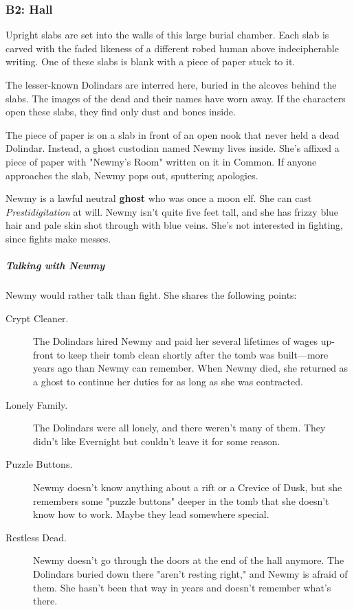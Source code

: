 \documentclass[10pt,a4paper,twoside,bg=print,twocolumn,openany,nodeprecatedcode]{dndbook}
\begin{document}
\subsubsection{B2: Hall}
\begin{DndReadAloud}{}
Upright slabs are set into the walls of this large burial chamber. Each slab is carved with the faded likeness of a different robed human above indecipherable writing. One of these slabs is blank with a piece of paper stuck to it.

\end{DndReadAloud}

The lesser-known Dolindars are interred here, buried in the alcoves behind the slabs. The images of the dead and their names have worn away. If the characters open these slabs, they find only dust and bones inside.

The piece of paper is on a slab in front of an open nook that never held a dead Dolindar. Instead, a ghost custodian named Newmy lives inside. She's affixed a piece of paper with "Newmy's Room" written on it in Common. If anyone approaches the slab, Newmy pops out, sputtering apologies.

Newmy is a lawful neutral \textbf{ghost} who was once a moon elf. She can cast \textit{Prestidigitation} at will. Newmy isn't quite five feet tall, and she has frizzy blue hair and pale skin shot through with blue veins. She's not interested in fighting, since fights make messes.

\subparagraph{Talking with Newmy}
Newmy would rather talk than fight. She shares the following points:


\begin{description}
\item[Crypt Cleaner.]
The Dolindars hired Newmy and paid her several lifetimes of wages up-front to keep their tomb clean shortly after the tomb was built—more years ago than Newmy can remember. When Newmy died, she returned as a ghost to continue her duties for as long as she was contracted.
\item[Lonely Family.]
The Dolindars were all lonely, and there weren't many of them. They didn't like Evernight but couldn't leave it for some reason.
\item[Puzzle Buttons.]
Newmy doesn't know anything about a rift or a Crevice of Dusk, but she remembers some "puzzle buttons" deeper in the tomb that she doesn't know how to work. Maybe they lead somewhere special.
\item[Restless Dead.]
Newmy doesn't go through the doors at the end of the hall anymore. The Dolindars buried down there "aren't resting right," and Newmy is afraid of them. She hasn't been that way in years and doesn't remember what's there.
\end{description}
\end{document}
